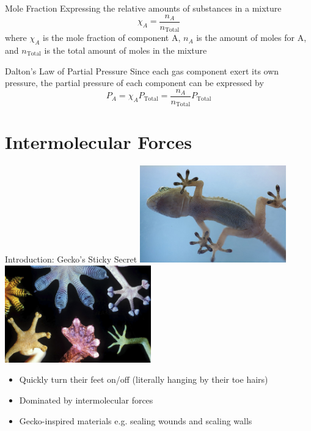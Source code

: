 \documentclass[11pt]{beamer}
\begin{document}
\begin{frame}{Mole Fraction}
  Expressing the relative amounts of substances in a mixture
  \begin{equation}
    \chi_A = \frac{n_A}{n_\text{Total}}
  \end{equation}
  where $\chi_A$ is the mole fraction of component A, $n_A$ is the
  amount of moles for A, and $n_\text{Total}$ is the total amount of
  moles in the mixture
\end{frame}

\begin{frame}{Dalton's Law of Partial Pressure}
  Since each gas component exert its own pressure, the partial pressure
  of each component can be expressed by
  \begin{equation}
    P_A = \chi_A P_\text{Total} = \frac{n_A}{n_\text{Total}} P_\text{Total}
  \end{equation}
\end{frame}

\section{Intermolecular Forces}

\begin{frame}{Introduction: Gecko's Sticky Secret}
  \center
  \includegraphics[width=0.475\textwidth]{gecko-feet.jpg}
  \hfill
  \includegraphics[width=0.475\textwidth]{inspired_feet.png}
  \begin{itemize}
    \item Quickly turn their feet on/off (literally hanging by
      their toe hairs)
    \item Dominated by intermolecular forces
    \item Gecko-inspired materials e.g. sealing wounds and scaling
      walls
  \end{itemize}
\end{frame}
\end{document}
